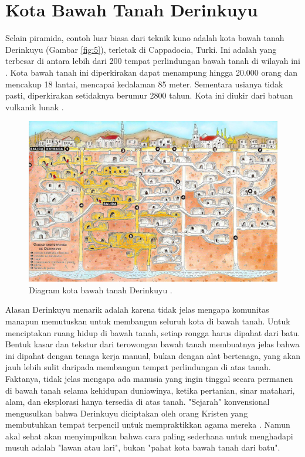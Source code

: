 \documentclass[10pt,twocolumn,letterpaper]{article}
\begin{document}
\section{Kota Bawah Tanah Derinkuyu}

Selain piramida, contoh luar biasa dari teknik kuno adalah kota bawah tanah Derinkuyu (Gambar \ref{fig:5}), terletak di Cappadocia, Turki. Ini adalah yang terbesar di antara lebih dari 200 tempat perlindungan bawah tanah di wilayah ini \cite{54}. Kota bawah tanah ini diperkirakan dapat menampung hingga 20.000 orang dan mencakup 18 lantai, mencapai kedalaman 85 meter. Sementara usianya tidak pasti, diperkirakan setidaknya berumur 2800 tahun. Kota ini diukir dari batuan vulkanik lunak \cite{52, 53}.

\begin{figure}[b]
\begin{center}
   \includegraphics[width=1\linewidth]{derinkuyu.jpeg}
\end{center}
   \caption{Diagram kota bawah tanah Derinkuyu \cite{56}.}
\label{fig:5}
\label{fig:onecol}
\end{figure}
Alasan Derinkuyu menarik adalah karena tidak jelas mengapa komunitas manapun memutuskan untuk membangun seluruh kota di bawah tanah. Untuk menciptakan ruang hidup di bawah tanah, setiap rongga harus dipahat dari batu. Bentuk kasar dan tekstur dari terowongan bawah tanah membuatnya jelas bahwa ini dipahat dengan tenaga kerja manual, bukan dengan alat bertenaga, yang akan jauh lebih sulit daripada membangun tempat perlindungan di atas tanah. Faktanya, tidak jelas mengapa ada manusia yang ingin tinggal secara permanen di bawah tanah selama kehidupan duniawinya, ketika pertanian, sinar matahari, alam, dan eksplorasi hanya tersedia di atas tanah. "Sejarah" konvensional mengusulkan bahwa Derinkuyu diciptakan oleh orang Kristen yang membutuhkan tempat terpencil untuk mempraktikkan agama mereka \cite{53}. Namun akal sehat akan menyimpulkan bahwa cara paling sederhana untuk menghadapi musuh adalah "lawan atau lari", bukan "pahat kota bawah tanah dari batu".
\end{document}
